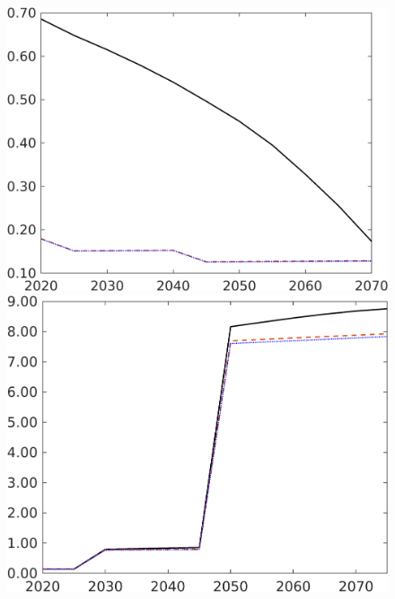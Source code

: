 \begin{figure}[h!!]
	\begin{minipage}[]{0.32\textwidth}
		\includegraphics[width=1\textwidth]{../../codding_model/own_basedOnFried/optimalPol_190722_tidiedUp/figures/all_July22/gAagg_CompEffOPT_T_NoTaus_pol4_spillover0_noskill0_sep1_xgrowth0_etaa0.79_lgd0_lff0.png}
	\end{minipage}
	\begin{minipage}[]{0.32\textwidth}
		\includegraphics[width=1\textwidth]{../../codding_model/own_basedOnFried/optimalPol_190722_tidiedUp/figures/all_July22/GFF_CompEffOPT_T_NoTaus_pol4_spillover0_noskill0_sep1_xgrowth0_etaa0.79_lgd0_lff0.png}

\end{minipage}
\end{figure}
